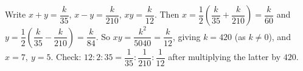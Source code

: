 Write $x+y=\dfrac k{35}$, $x-y=\dfrac k{210}$, $xy=\dfrac k{12}$. Then $x=\dfrac12\left(\dfrac k{35}+\dfrac k{210}\right)=\dfrac k{60}$ and $y=\dfrac12\left(\dfrac k{35}-\dfrac k{210}\right)=\dfrac k{84}$. So $xy=\dfrac{k^2}{5040}=\dfrac k{12}$, giving $k=420$ (as $k\ne0$), and $\boxed{x=7,\ y=5}$. Check: $12:2:35=\dfrac1{35}:\dfrac1{210}:\dfrac1{12}$ after multiplying the latter by $420$.
